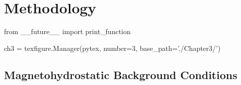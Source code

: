 \label{ch:Methodology}
\chapter{Methodology}  %

\begin{pycode}[chapter3]
from __future__ import print_function

ch3 = texfigure.Manager(pytex, number=3, base_path='./Chapter3/')
\end{pycode}

%

%
%
%		
%	

\section{Magnetohydrostatic Background Conditions}\label{sec:mhsbackground}

